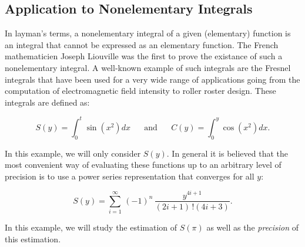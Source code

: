 \documentclass[12pt,]{krantz}
\begin{document}
\subsection{Application to Nonelementary
Integrals}\label{application-to-nonelementary-integrals}

In layman's terms, a nonelementary integral of a given (elementary)
function is an integral that cannot be expressed as an elementary
function. The French mathematicien Joseph Liouville was the first to
prove the existance of such a nonelementary integral. A well-known
example of such integrals are the Fresnel integrals that have been used
for a very wide range of applications going from the computation of
electromagnetic field intensity to roller roster design. These integrals
are defined as:

\[S(y) = \int_0^t \sin\left(x^2\right) dx \;\;\;\;\;\; \text{and}  \;\;\;\;\;\; 
C(y) = \int_0^y \cos \left( x^2 \right) dx.\]

In this example, we will only consider \(S(y)\). In general it is
believed that the most convenient way of evaluating these functions up
to an arbitrary level of precision is to use a power series
representation that converges for all \(y\):

\[
S(y) = \sum_{i = 1}^\infty \, \left(-1\right)^n \, \frac{y^{4i + 1}}{\left(2i + 1\right) \, !\left(4i + 3\right)}.
\]

In this example, we will study the estimation of \(S(\pi)\) as well as
the \emph{precision} of this estimation.
\end{document}
